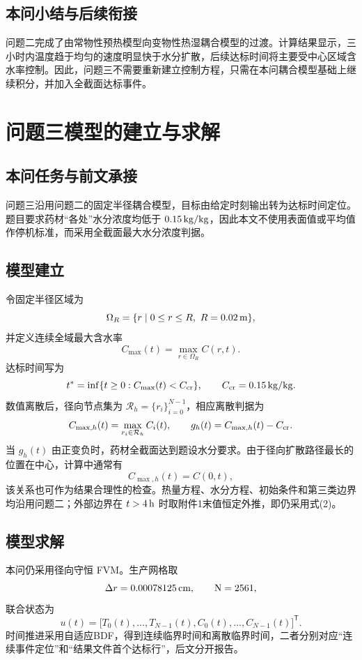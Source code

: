 \documentclass[UTF8,a4paper,12pt]{ctexart}
\begin{document}
\subsection{本问小结与后续衔接}
问题二完成了由常物性预热模型向变物性热湿耦合模型的过渡。计算结果显示，三小时内温度趋于均匀的速度明显快于水分扩散，后续达标时间将主要受中心区域含水率控制。因此，问题三不需要重新建立控制方程，只需在本问耦合模型基础上继续积分，并加入全截面达标事件。

\section{问题三模型的建立与求解}
\subsection{本问任务与前文承接}
问题三沿用问题二的固定半径耦合模型，目标由给定时刻输出转为达标时间定位。题目要求药材“各处”水分浓度均低于 $0.15\rm\,kg/kg$，因此本文不使用表面值或平均值作停机标准，而采用全截面最大水分浓度判据。

\subsection{模型建立}
令固定半径区域为
\begin{equation}
  \Omega_R=\{r\mid 0\le r\le R,\ R=0.02\rm\,m\},
\end{equation}
并定义连续全域最大含水率
\begin{equation}
  C_{\max}(t)=\max_{r\in\Omega_R}C(r,t).
\end{equation}
达标时间写为
\begin{equation}
  t^*=\inf\{t\ge0: C_{\max}(t)<C_{\rm cr}\},\qquad C_{\rm cr}=0.15\rm\,kg/kg.
\end{equation}
数值离散后，径向节点集为 $\mathcal R_h=\{r_i\}_{i=0}^{N-1}$，相应离散判据为
\begin{equation}
  C_{\max,h}(t)=\max_{r_i\in\mathcal R_h}C_i(t),\qquad
  g_h(t)=C_{\max,h}(t)-C_{\rm cr}.
\end{equation}
当 $g_h(t)$ 由正变负时，药材全截面达到题设水分要求。由于径向扩散路径最长的位置在中心，计算中通常有
\begin{equation}
  C_{\max,h}(t)=C(0,t),
\end{equation}
该关系也可作为结果合理性的检查。热量方程、水分方程、初始条件和第三类边界均沿用问题二；外部边界在 $t>4\rm\,h$ 时取附件1末值恒定外推，即仍采用式(2)。

\subsection{模型求解}
本问仍采用径向守恒 FVM。生产网格取
\begin{equation}
  \Delta r=0.00078125\rm\,cm,
  \qquad N=2561,
\end{equation}
联合状态为
\begin{equation}
  u(t)=\bigl[T_0(t),\ldots,T_{N-1}(t),C_0(t),\ldots,C_{N-1}(t)\bigr]^{\mathsf T}.
\end{equation}
时间推进采用自适应BDF，得到连续临界时间和离散临界时间，二者分别对应“连续事件定位”和“结果文件首个达标行”，后文分开报告。
\end{document}
